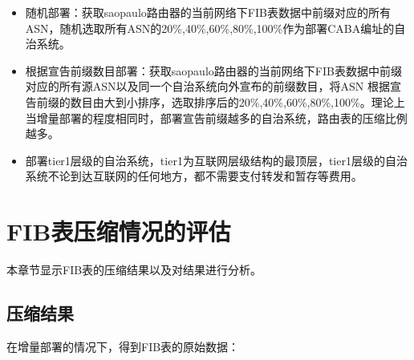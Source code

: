 \begin{itemize}
    \begin{itemize}
        \item 随机部署：获取saopaulo路由器的当前网络下FIB表数据中前缀对应的所有ASN，随机选取所有ASN的20\%,40\%,60\%,80\%,100\%作为部署CABA编址的自治系统。
        \item 根据宣告前缀数目部署：获取saopaulo路由器的当前网络下FIB表数据中前缀对应的所有源ASN以及同一个自治系统向外宣布的前缀数目，将ASN 根据宣告前缀的数目由大到小排序，选取排序后的20\%,40\%,60\%,80\%,100\%。理论上当增量部署的程度相同时，部署宣告前缀越多的自治系统，路由表的压缩比例越多。
        \item 部署tier1层级的自治系统，tier1为互联网层级结构的最顶层，tier1层级的自治系统不论到达互联网的任何地方，都不需要支付转发和暂存等费用\cite{tier1}。
    \end{itemize}

\end{itemize}
\section{FIB表压缩情况的评估}
本章节显示FIB表的压缩结果以及对结果进行分析。
\subsection{压缩结果}
在增量部署的情况下，得到FIB表的原始数据：

